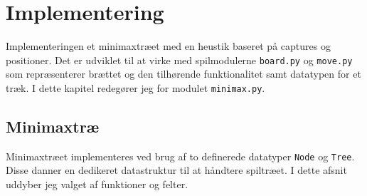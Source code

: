 \section{Implementering}
Implementeringen et minimaxtræet med en heustik baseret på captures og positioner. 
Det er udviklet til at virke med spilmodulerne \texttt{board.py} og \texttt{move.py} som repræsenterer brættet og den tilhørende
funktionalitet samt datatypen for et træk.
I dette kapitel redegører jeg for modulet \texttt{minimax.py}.

\subsection{Minimaxtræ}
Minimaxtræet implementeres ved brug af to definerede datatyper \texttt{Node} og \texttt{Tree}.
Disse danner en dedikeret datastruktur til at håndtere spiltræet. I dette afsnit uddyber jeg
valget af funktioner og felter.

\newpage
